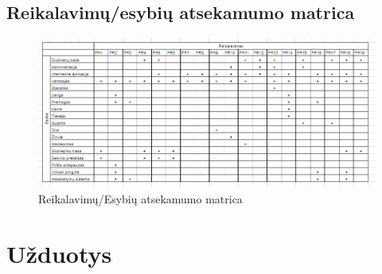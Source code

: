 \documentclass[oneside]{VUMIFPSkursinis}
\begin{document}
\subsection{Reikalavimų/esybių atsekamumo matrica}	
\begin{figure}[h]
    \centering
    \includegraphics[width=1\textwidth]{Reikalavimai_Esybes.png}
    \caption{Reikalavimų/Esybių atsekamumo matrica}
    \label{fig:r/e_matrica}
\end{figure}




\section{Užduotys}
\end{document}
